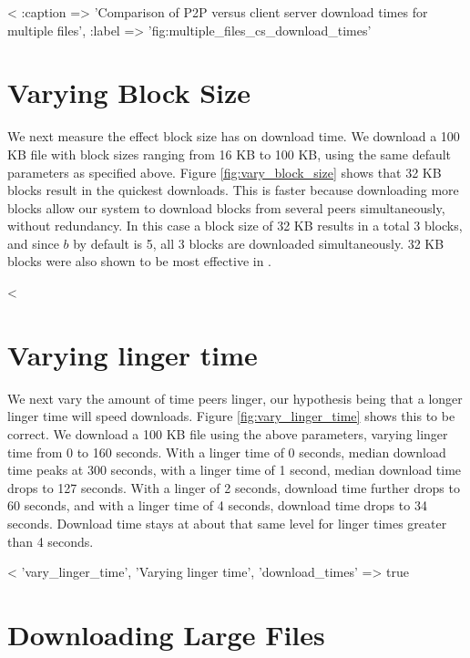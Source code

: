 <%
  :caption => 'Comparison of P2P versus client server download times for multiple files', :label => 'fig:multiple_files_cs_download_times' %

\section{Varying Block Size}

We next measure the effect block size has on download time. We download a 100 KB file with block sizes ranging from 
16 KB to 100 KB, using the same default parameters as specified above.  Figure \ref{fig:vary_block_size} shows that 32 KB blocks result
in the quickest downloads.  This is faster because downloading more blocks allow our system to download 
blocks from several peers simultaneously, without redundancy.  In this case a block size of 32 KB results in a total 3 blocks, and since $b$ by default is 5, all 3 blocks
are downloaded simultaneously. 32 KB blocks were also shown to be most effective in \cite{32_kb_blocks}.

<%

\section{Varying linger time}

We next vary the amount of time peers linger, our hypothesis being that a longer linger 
time will speed downloads.  Figure \ref{fig:vary_linger_time} shows this to be correct.
We download a 100 KB file using the above parameters, varying linger time from 0 to 160 seconds.
With a linger time of 0 seconds, median download time peaks at 300 seconds, with 
a linger time of 1 second, median download time drops to 127 seconds.  With a linger of 2 seconds, download time further drops to 60 seconds, and
with a linger time of 4 seconds, download time drops to 34 seconds.  Download time stays at about that same level for linger times greater than 4 seconds.

<%
 'vary_linger_time', 'Varying linger time', 'download_times' => true  %

\section{Downloading Large Files}


